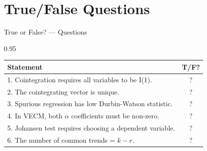 \documentclass[9pt, aspectratio=169, t]{beamer}
\begin{document}
\section{True/False Questions}

\begin{frame}{True or False? --- Questions}
    \begin{cminipage}{0.95\textwidth}
    \footnotesize
    \begin{center}
    \begin{tabular}{p{9cm}c}
        \toprule
        \textbf{Statement} & \textbf{T/F?} \\
        \midrule
        1. Cointegration requires all variables to be I(1). & ? \\[0.15cm]
        2. The cointegrating vector is unique. & ? \\[0.15cm]
        3. Spurious regression has low Durbin-Watson statistic. & ? \\[0.15cm]
        4. In VECM, both $\alpha$ coefficients must be non-zero. & ? \\[0.15cm]
        5. Johansen test requires choosing a dependent variable. & ? \\[0.15cm]
        6. The number of common trends = $k - r$. & ? \\
        \bottomrule
    \end{tabular}
    \end{center}
    \end{cminipage}
\end{frame}
\end{document}

